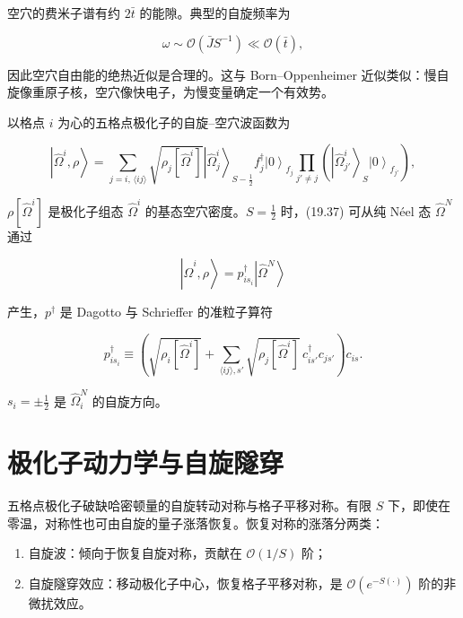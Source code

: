 空穴的费米子谱有约 $2\bar{t}$ 的能隙。典型的自旋频率为

\begin{equation*}
\omega \sim \mathcal {O} ( \bar {J} S ^ {- 1} ) \ll \mathcal {O} ( \bar {t} ) ,
\tag{19.36}
\end{equation*}

因此空穴自由能的绝热近似是合理的。这与 Born--Oppenheimer 近似类似：慢自旋像重原子核，空穴像快电子，为慢变量确定一个有效势。

以格点 $i$ 为心的五格点极化子的自旋--空穴波函数为

\begin{equation*}
\left| \hat {\Omega} ^ {i}, \rho \right\rangle = \sum_{j = i, \, \langle ij \rangle} \sqrt {\rho_{j} [ \hat {\Omega} ^ {i} ]} \left| \hat {\Omega}_{j} ^ {i} \right\rangle_{S - \frac {1}{2}} f _ {j} ^ {\dagger} \left| 0 \right\rangle_{f _ {j}} \prod_{j ' \neq j} \left( \left| \hat {\Omega}_{j '} ^ {i} \right\rangle_{S} \left| 0 \right\rangle_{f _ {j '}} \right) ,
\tag{19.37}
\end{equation*}

$\rho[\hat{\Omega}^i]$ 是极化子组态 $\hat{\Omega}^i$ 的基态空穴密度。$S = \frac{1}{2}$ 时，(19.37) 可从纯 Néel 态 $\hat{\Omega}^N$ 通过

\begin{equation*}
\left| \hat {\Omega} ^ {i}, \rho \right\rangle = p _ {is _ {i}} ^ {\dagger} \left| \hat {\Omega} ^ {N} \right\rangle
\tag{19.38}
\end{equation*}

产生，$p^{\dagger}$ 是 Dagotto 与 Schrieffer 的准粒子算符

\begin{equation*}
p _ {is _ {i}} ^ {\dagger} \equiv \left( \sqrt {\rho_{i} [ \hat {\Omega} ^ {i} ]} + \sum_{\langle ij \rangle, s '} \sqrt {\rho_{j} [ \hat {\Omega} ^ {i} ]} \, c_{is '} ^ {\dagger} c_{js '} \right) c_{is}.
\tag{19.39}
\end{equation*}

$s_i = \pm \frac{1}{2}$ 是 $\hat{\Omega}_i^N$ 的自旋方向。

\section{极化子动力学与自旋隧穿}

五格点极化子破缺哈密顿量的自旋转动对称与格子平移对称。有限 $S$ 下，即使在零温，对称性也可由自旋的量子涨落恢复。恢复对称的涨落分两类：

\begin{enumerate}[itemsep=1pt]
\item 自旋波：倾向于恢复自旋对称，贡献在 $\mathcal{O}(1/S)$ 阶；
\item 自旋隧穿效应：移动极化子中心，恢复格子平移对称，是 $\mathcal{O}(e^{-S(\cdot)})$ 阶的非微扰效应。
\end{enumerate}

